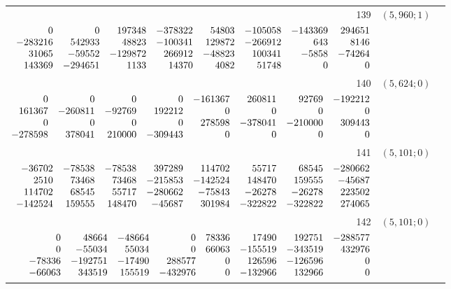 \documentclass[11pt]{article}
\theoremstyle{remark}
\numberwithin{equation}{section}
\begin{document}
\begin{longtable}{rcl}
139 & $(5,960;1)$ & \begin{tabular}[t]{@{}l@{}}$w_i=\displaystyle \frac{1201199563946272157}{1839063466538089351120000000000000000}$\\[3pt]{\scriptsize$\begin{array}{@{}rrrrrrrr@{}}0 & 0 & 197348 & -378322 & 54803 & -105058 & -143369 & 294651\\-283216 & 542933 & 48823 & -100341 & 129872 & -266912 & 643 & 8146\\31065 & -59552 & -129872 & 266912 & -48823 & 100341 & -5858 & -74264\\143369 & -294651 & 1133 & 14370 & 4082 & 51748 & 0 & 0\end{array}$}\end{tabular}\\[8pt]
140 & $(5,624;0)$ & \begin{tabular}[t]{@{}l@{}}$w_i=\displaystyle \frac{1537666233516861473}{10361552426581658493440000000000000000}$\\[3pt]{\scriptsize$\begin{array}{@{}rrrrrrrr@{}}0 & 0 & 0 & 0 & -161367 & 260811 & 92769 & -192212\\161367 & -260811 & -92769 & 192212 & 0 & 0 & 0 & 0\\0 & 0 & 0 & 0 & 278598 & -378041 & -210000 & 309443\\-278598 & 378041 & 210000 & -309443 & 0 & 0 & 0 & 0\end{array}$}\end{tabular}\\[8pt]
141 & $(5,101;0)$ & \begin{tabular}[t]{@{}l@{}}$w_i=\displaystyle \frac{814213404213043221}{1137891475059258968320000000000000000}$\\[3pt]{\scriptsize$\begin{array}{@{}rrrrrrrr@{}}-36702 & -78538 & -78538 & 397289 & 114702 & 55717 & 68545 & -280662\\2510 & 73468 & 73468 & -215853 & -142524 & 148470 & 159555 & -45687\\114702 & 68545 & 55717 & -280662 & -75843 & -26278 & -26278 & 223502\\-142524 & 159555 & 148470 & -45687 & 301984 & -322822 & -322822 & 274065\end{array}$}\end{tabular}\\[8pt]
142 & $(5,101;0)$ & \begin{tabular}[t]{@{}l@{}}$w_i=\displaystyle \frac{8422011337352855623}{14310956525563713817600000000000000000}$\\[3pt]{\scriptsize$\begin{array}{@{}rrrrrrrr@{}}0 & 48664 & -48664 & 0 & 78336 & 17490 & 192751 & -288577\\0 & -55034 & 55034 & 0 & 66063 & -155519 & -343519 & 432976\\-78336 & -192751 & -17490 & 288577 & 0 & 126596 & -126596 & 0\\-66063 & 343519 & 155519 & -432976 & 0 & -132966 & 132966 & 0\end{array}$}\end{tabular}\\[8pt]

\end{longtable}
\end{document}
